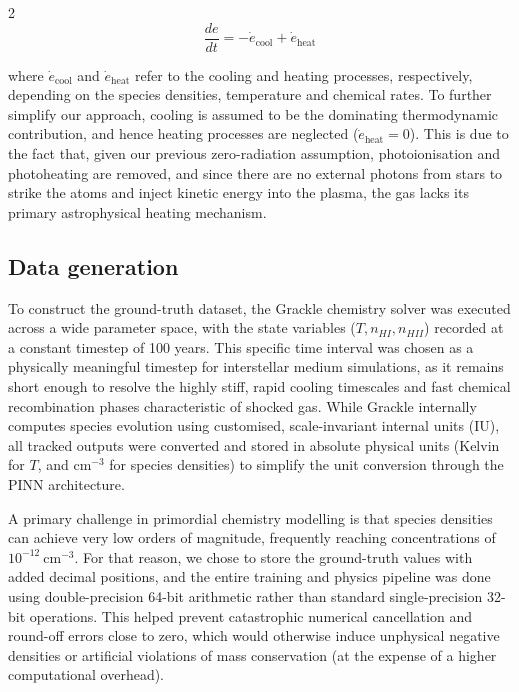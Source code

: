 \documentclass[10pt,a4paper]{article}
\begin{document}
\begin{multicols}{2}
\begin{equation}
\frac{de}{dt}=-\dot{e}_{\text{cool}}+\dot{e}_{\text {heat}}
\label{eq:de/dt}
\end{equation}


where $\dot{e}_{\text {cool}}$ and $\dot{e}_{\text {heat}}$ refer to the cooling and heating processes, respectively, depending on the species densities, temperature and chemical rates. To further simplify our approach, cooling is assumed to be the dominating thermodynamic contribution, and hence heating processes are neglected ($\dot{e}_{\text{heat}} = 0$). This is due to the fact that, given our previous zero-radiation assumption, photoionisation and photoheating are removed, and since there are no external photons from stars to strike the atoms and inject kinetic energy into the plasma, the gas lacks its primary astrophysical heating mechanism.


\subsection{Data generation}

To construct the ground-truth dataset, the Grackle chemistry solver was executed across a wide parameter space, with the state variables ($T, n_{HI}, n_{HII}$) recorded at a constant timestep of 100 years. This specific time interval was chosen as a physically meaningful timestep for interstellar medium simulations, as it remains short enough to resolve the highly stiff, rapid cooling timescales and fast chemical recombination phases characteristic of shocked gas. While Grackle internally computes species evolution using customised, scale-invariant internal units (IU), all tracked outputs were converted and stored in absolute physical units (Kelvin for $T$, and $\text{cm}^{-3}$ for species densities) to simplify the unit conversion through the PINN architecture.

A primary challenge in primordial chemistry modelling is that species densities can achieve very low orders of magnitude, frequently reaching concentrations of $10^{-12} \ \text{cm}^{-3}$. For that reason, we chose to store the ground-truth values with added decimal positions, and the entire training and physics pipeline was done using double-precision 64-bit arithmetic rather than standard single-precision 32-bit operations. This helped prevent catastrophic numerical cancellation and round-off errors close to zero, which would otherwise induce unphysical negative densities or artificial violations of mass conservation (at the expense of a higher computational overhead).


\end{multicols}
\end{document}
